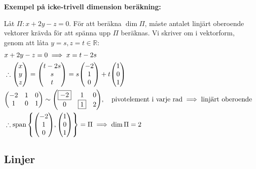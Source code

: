 \begin{ber}
	\textbf{Exempel på icke-trivell dimension beräkning:}

	Låt $\Pi:x+2y-z=0$. För att beräkna $\dim\Pi$, måste antalet linjärt
	oberoende vektorer krävda för att spänna upp $\Pi$ beräknas. Vi skriver om i
	vektorform, genom att låta $y=s,z=t\in\mathbb{R}$:
	\begin{align*}
		&x+2y-z=0\implies x=t-2s\\
		&\therefore\qty(\begin{matrix}
			x\\y\\z
		\end{matrix})=\qty(\begin{matrix}
			t-2s\\s\\t
		\end{matrix})=s\qty(\begin{matrix}
			-2\\1\\0
		\end{matrix})+t\qty(\begin{matrix}
			1\\0\\1
		\end{matrix})\\
		&\qty(\begin{matrix}
			-2&1&0\\
			1&0&1
		\end{matrix})\sim\qty(\begin{matrix}
			\boxed{-2}&1&0\\
			0&\boxed{1}&2
		\end{matrix}),\quad\text{pivotelement i varje rad}\implies\text{linjärt oberoende}\\
		&\therefore\operatorname{span}\qty{\qty(\begin{matrix}
			-2\\1\\0
		\end{matrix}),\qty(\begin{matrix}
			1\\0\\1
		\end{matrix})}=\Pi\implies\dim\Pi=2
	\end{align*}
\end{ber}

\subsection{Linjer}

